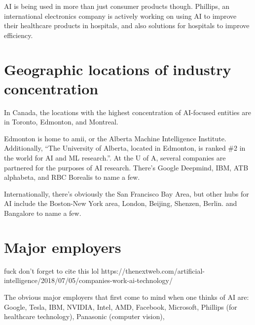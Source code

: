 \documentclass[letterpaper,12pt]{article}
\begin{document}
AI is being used in more than just consumer products though. Phillips,
an international electronics company is actively working on using
AI to improve their healthcare products in hospitals, and also 
solutions for hospitals to improve efficiency.




\section{Geographic locations of industry concentration}

In Canada, the locations with the highest concentration of AI-focused
entities are in Toronto, Edmonton, and Montreal.\cite{investincanada}

Edmonton is home to amii, or the Alberta Machine Intelligence Institute.
Additionally, ``The University of Alberta, located in Edmonton, is ranked \#2 in the world for AI and ML research.''\cite{investincanada}\cite{edmonton.ai}.
At the U of A, several companies are partnered for the purposes of AI research.
There's Google Deepmind, IBM, ATB alphabeta, and RBC Borealis to name a few.

Internationally, there's obviously the San Francisco Bay Area,
but other hubs for AI include
the Boston-New York area,
London,
Beijing,
Shenzen,
Berlin.
and Bangalore to name a few.\cite{aihubs}\cite{aihubsreview}

\section{Major employers}

fuck don't forget to cite this lol https://thenextweb.com/artificial-intelligence/2018/07/05/companies-work-ai-technology/

The obvious major employers that first come to mind when one thinks of AI are:
Google,
Tesla,
IBM,
NVIDIA, Intel, AMD,
Facebook,
Microsoft,
Phillips (for healthcare technology),
Panasonic (computer vision),
\end{document}
